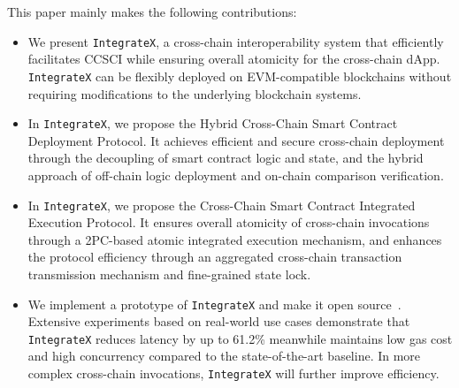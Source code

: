 This paper mainly makes the following contributions:
\begin{itemize}[left=0pt]
    \item We present \texttt{IntegrateX}, a cross-chain interoperability system that efficiently facilitates CCSCI while ensuring overall atomicity for the cross-chain dApp. 
    \texttt{IntegrateX} can be flexibly deployed on EVM-compatible blockchains without requiring modifications to the underlying blockchain systems. 
    \item In \texttt{IntegrateX}, we propose the Hybrid Cross-Chain Smart Contract Deployment Protocol. 
    It achieves efficient and secure cross-chain deployment through the decoupling of smart contract logic and state, and the hybrid approach of off-chain logic deployment and on-chain comparison verification.
    \item In \texttt{IntegrateX}, we propose the Cross-Chain Smart Contract Integrated Execution Protocol. 
    It ensures overall atomicity of cross-chain invocations through a 2PC-based atomic integrated execution mechanism, and enhances the protocol efficiency through an aggregated cross-chain transaction transmission mechanism and fine-grained state lock.
    \item We implement a prototype of \texttt{IntegrateX} and make it open source~\cite{INTEGRATEX}. 
    Extensive experiments based on real-world use cases demonstrate that \texttt{IntegrateX} reduces latency by up to 61.2\% meanwhile maintains low gas cost and high concurrency compared to the state-of-the-art baseline. 
    In more complex cross-chain invocations, \texttt{IntegrateX} will further improve efficiency.
\end{itemize}
